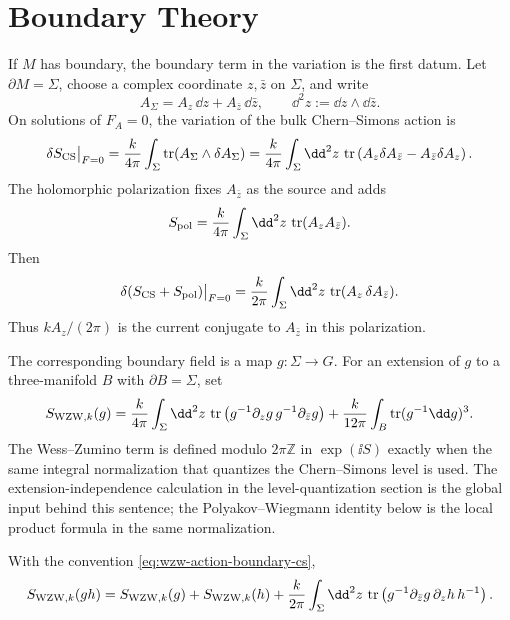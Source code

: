 \section{Boundary Theory}

If \(M\) has boundary, the boundary term in the variation is the first
datum.  Let \(\partial M=\Sigma\), choose a complex coordinate \(z,\bar z\)
on \(\Sigma\), and write
\[
  A_\Sigma=A_z\,\dd z+A_{\bar z}\,\dd\bar z,
  \qquad
  \dd^2z:=\dd z\wedge\dd\bar z .
\]
On solutions of \(F_A=0\), the variation of the bulk Chern--Simons action is
\[
  \delta S_{\rm CS}\big|_{F=0}
  =
  \frac{k}{4\pi}\int_\Sigma
  \operatorname{tr}(A_\Sigma\wedge\delta A_\Sigma)
  =
  \frac{k}{4\pi}\int_\Sigma\dd^2z\,
  \operatorname{tr}
  \left(A_z\delta A_{\bar z}-A_{\bar z}\delta A_z\right).
\]
The holomorphic polarization fixes \(A_{\bar z}\) as the source and adds
\[
  S_{\rm pol}
  =
  \frac{k}{4\pi}\int_\Sigma\dd^2z\,
  \operatorname{tr}(A_zA_{\bar z}).
\]
Then
\begin{equation}
  \delta(S_{\rm CS}+S_{\rm pol})\big|_{F=0}
  =
  \frac{k}{2\pi}\int_\Sigma\dd^2z\,
  \operatorname{tr}(A_z\,\delta A_{\bar z}).
  \label{eq:cs-boundary-polarized-variation}
\end{equation}
Thus \(kA_z/(2\pi)\) is the current conjugate to \(A_{\bar z}\) in this
polarization.

The corresponding boundary field is a map \(g:\Sigma\to G\).  For an
extension of \(g\) to a three-manifold \(B\) with \(\partial B=\Sigma\), set
\begin{equation}
  S_{{\rm WZW},k}(g)
  =
  \frac{k}{4\pi}\int_\Sigma\dd^2z\,
  \operatorname{tr}
  \left(g^{-1}\partial_zg\,g^{-1}\partial_{\bar z}g\right)
  +
  \frac{k}{12\pi}\int_B
  \operatorname{tr}(g^{-1}\dd g)^3 .
  \label{eq:wzw-action-boundary-cs}
\end{equation}
The Wess--Zumino term is defined modulo \(2\pi\mathbb Z\) in
\(\exp(\ii S)\) exactly when the same integral normalization that quantizes
the Chern--Simons level is used.  The extension-independence calculation in
the level-quantization section is the global input behind this sentence; the
Polyakov--Wiegmann identity below is the local product formula in the same
normalization.

\begin{lemma}
\label{lem:polyakov-wiegmann-boundary}
With the convention \eqref{eq:wzw-action-boundary-cs},
\[
  S_{{\rm WZW},k}(gh)
  =
  S_{{\rm WZW},k}(g)+S_{{\rm WZW},k}(h)
  +
  \frac{k}{2\pi}\int_\Sigma\dd^2z\,
  \operatorname{tr}
  \left(g^{-1}\partial_{\bar z}g\,
  \partial_zh\,h^{-1}\right).
\]
\end{lemma}

